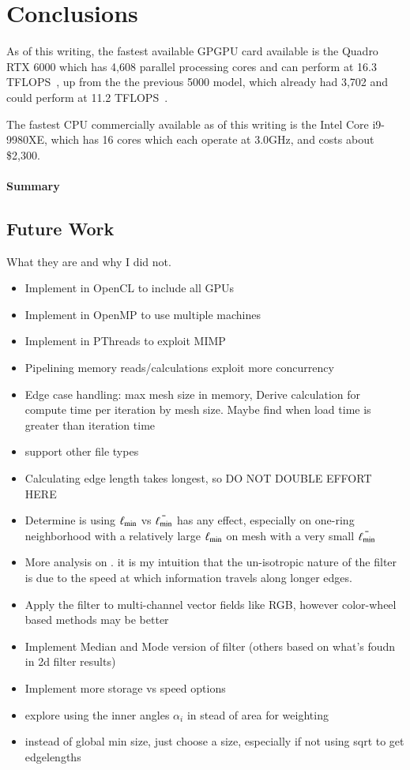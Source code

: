 \chapter{Conclusions}
As of this writing, the fastest available GPGPU card available is the Quadro RTX 6000 which has 4,608 parallel processing cores and can perform at 16.3 TFLOPS~\cite{quadro6k}, up from the the previous 5000 model, which already had 3,702 and could perform at 11.2 TFLOPS~\cite{quadro5k}.

The fastest CPU commercially available as of this writing is the Intel Core i9-9980XE, which has 16 cores which each operate at 3.0GHz, and costs about \$2,300.

%
%
%
%
\subsubsection{Summary}

%
%
%
%
\section{Future Work}
What they are and why I did not.
\begin{itemize}
	\item Implement in OpenCL to include all GPUs
	\item Implement in OpenMP to use multiple machines
	\item Implement in PThreads to exploit MIMP
	\item Pipelining memory reads/calculations exploit more concurrency
	\item Edge case handling: max mesh size in memory, Derive calculation for compute time per iteration by mesh size. Maybe find when load time is greater than iteration time
	\item support other file types
	\item Calculating edge length takes longest, so DO NOT DOUBLE EFFORT HERE
	\item Determine is using $\ell_\text{min}$ vs $\bar{\ell_\text{min}}$ has any effect, especially on one-ring neighborhood with a relatively large $\ell_\text{min}$ on mesh with a very small $\bar{\ell_\text{min}}$
	\item More analysis on \fors. it is my intuition that the un-isotropic nature of the filter is due to the speed at which information travels along longer edges.
	\item Apply the filter to multi-channel vector fields like RGB, however color-wheel based methods may be better
	\item Implement Median and Mode version of filter (others based on what's foudn in 2d filter results)
	\item Implement more storage vs speed options
	\item explore using the inner angles $\alpha_i$ in stead of area for weighting
	\item instead of global min size, just choose a size, especially if not using sqrt to get edgelengths
\end{itemize}

